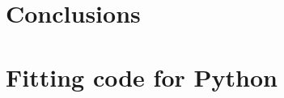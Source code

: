 \documentclass[a4paper, 10pt, nanum]{CSUniSchoolLabReport}
\begin{document}
\section{Conclusions}




\section{Fitting code for Python}




\end{document}
